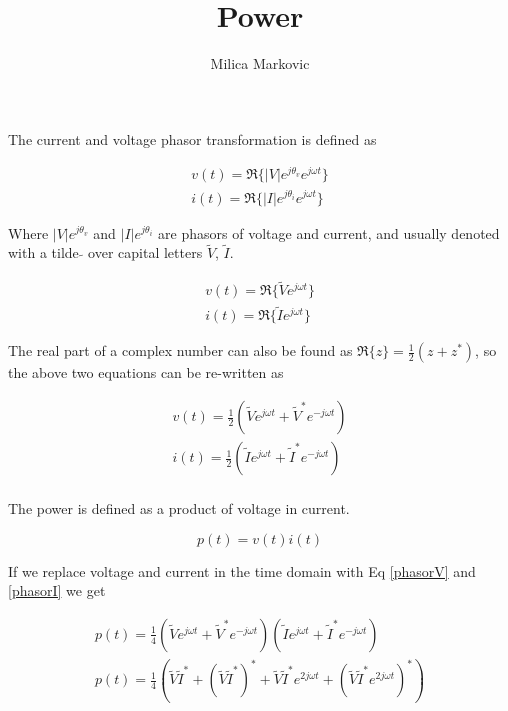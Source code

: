 \documentclass{ximera}
\title{Power}
\author{Milica Markovic}
\begin{document}
  
\begin{abstract}  

\end{abstract}  
\maketitle    



The current and voltage phasor transformation is defined as

\begin{eqnarray}
v(t)=\Re\{|V|e^{j\theta_v} e^{j \omega t}\} \\
i(t)=\Re\{|I|e^{j\theta_i} e^{j \omega t}\}
\end{eqnarray}

Where $|V|e^{j\theta_v}$ and $|I|e^{j\theta_i}$ are phasors of voltage and current, and usually denoted with a tilde $\tilde{}$ over capital letters  $\tilde{V}$, $\tilde{I}$.


\begin{eqnarray}
v(t)=\Re\{\tilde{V} e^{j \omega t}\} \\
i(t)=\Re\{\tilde{I} e^{j \omega t}\}
\end{eqnarray}


The real part of a complex number can also be found as $\Re\{z\}=\frac{1}{2}(z +z^*)$, so the above two equations can be re-written as

\begin{eqnarray}
v(t)=\frac{1}{2} ( \tilde{V}e^{j \omega t} + \tilde{V}^*e^{-j \omega t} ) \label{phasorV}\\
i(t)=\frac{1}{2} ( \tilde{I}e^{j \omega t} + \tilde{I}^*e^{-j \omega t} ) \label{phasorI}\\
\end{eqnarray}

The power is defined as a product of voltage in current.

\begin{equation}
p(t) = v(t) i(t)
\end{equation}

If we replace voltage and current in the time domain with Eq \ref{phasorV} and \ref{phasorI} we get



\begin{eqnarray}
p(t) =\frac{1}{4} ( \tilde{V}e^{j \omega t} + \tilde{V}^*e^{-j \omega t} ) ( \tilde{I}e^{j \omega t} + \tilde{I}^*e^{-j \omega t} ) \\
p(t)=\frac{1}{4} (\tilde{V}\tilde{I}^*+ (\tilde{V}\tilde{I}^*)^*+ \tilde{V}\tilde{I}^* e^{2j \omega t}+ (\tilde{V}\tilde{I}^* e^{2j \omega t})^*)
\end{eqnarray}
\end{document}
